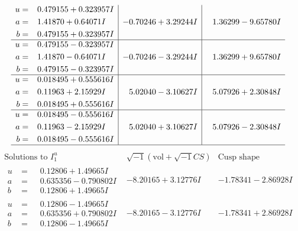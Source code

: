 \documentclass[1p]{elsarticle_modified}
\theoremstyle{definition}
\newcommand{\I}{\sqrt{-1}}
\begin{document}
$$\begin{array}{c|c|c}
\begin{aligned}
u &= \phantom{-}0.479155 + 0.323957 I \\
a &= \phantom{-}1.41870 + 0.64071 I \\
b &= \phantom{-}0.479155 + 0.323957 I\end{aligned}
 & -0.70246 + 3.29244 I & \phantom{-}1.36299 - 9.65780 I \\ \hline\begin{aligned}
u &= \phantom{-}0.479155 - 0.323957 I \\
a &= \phantom{-}1.41870 - 0.64071 I \\
b &= \phantom{-}0.479155 - 0.323957 I\end{aligned}
 & -0.70246 - 3.29244 I & \phantom{-}1.36299 + 9.65780 I \\ \hline\begin{aligned}
u &= \phantom{-}0.018495 + 0.555616 I \\
a &= \phantom{-}0.11963 + 2.15929 I \\
b &= \phantom{-}0.018495 + 0.555616 I\end{aligned}
 & \phantom{-}5.02040 - 3.10627 I & \phantom{-}5.07926 + 2.30848 I \\ \hline\begin{aligned}
u &= \phantom{-}0.018495 - 0.555616 I \\
a &= \phantom{-}0.11963 - 2.15929 I \\
b &= \phantom{-}0.018495 - 0.555616 I\end{aligned}
 & \phantom{-}5.02040 + 3.10627 I & \phantom{-}5.07926 - 2.30848 I\\
 \hline 
 \end{array}$$\newpage$$\begin{array}{c|c|c}  
\text{Solutions to }I^u_{1}& \I (\text{vol} + \sqrt{-1}CS) & \text{Cusp shape}\\
 \hline 
\begin{aligned}
u &= \phantom{-}0.12806 + 1.49665 I \\
a &= \phantom{-}0.635356 - 0.790802 I \\
b &= \phantom{-}0.12806 + 1.49665 I\end{aligned}
 & -8.20165 + 3.12776 I & -1.78341 - 2.86928 I \\ \hline\begin{aligned}
u &= \phantom{-}0.12806 - 1.49665 I \\
a &= \phantom{-}0.635356 + 0.790802 I \\
b &= \phantom{-}0.12806 - 1.49665 I\end{aligned}
 & -8.20165 - 3.12776 I & -1.78341 + 2.86928 I \\ \hline\begin{aligned}

\end{aligned}
\end{array}$$
\end{document}
